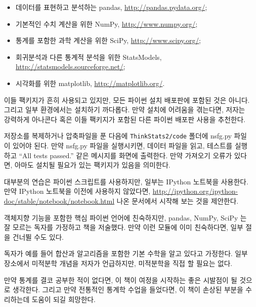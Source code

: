 \begin{itemize}

\item 데이터를 표현하고 분석하는 pandas, \url{http://pandas.pydata.org/};

\item 기본적인 수치 계산을 위한 NumPy, \url{http://www.numpy.org/};

\item 통계를 포함한 과학 계산을 위한 SciPy, \url{http://www.scipy.org/};

\item 회귀분석과 다른 통계적 분석을 위한 StatsModels, \url{http://statsmodels.sourceforge.net/};

\item 시각화를 위한 matplotlib, \url{http://matplotlib.org/}.

\end{itemize}

이들 팩키지가 흔히 사용되고 있지만, 모든 파이썬 설치 배포판에 포함된 것은 아니다. 그리고 일부 환경에서는 설치하기 까다롭다.
만약 설치에 어려움을 겪는다면, 저자는 강력하게 아나콘다 혹은 이들 팩키지가 포함된 다른 파이썬 배포판 사용을 추천한다. 

저장소를 복제하거나 압축파일을 푼 다음에 {\tt ThinkStats2/code} 폴더에 {nsfg.py} 파일이 있어야 된다.
만약 {nsfg.py} 파일을 실행시키면, 데이터 파일을 읽고, 테스트를 실행하고 ``All tests passed.'' 같은 메시지를 화면에 출력한다.
만약 가져오기 오류가 있다면, 아마도 설치될 필요가 있는 팩키지가 있음을 의미한다.

대부분의 연습은 파이썬 스크립트를 사용하지만, 일부는 IPython 노트북을 사용한다. 만약 IPython 노트북을 이전에 사용하지 않았다면, 
\url{http://ipython.org/ipython-doc/stable/notebook/notebook.html} 나온 문서에서 시작해 보는 것을 제안한다.

객체지향 기능을 포함한 핵심 파이썬 언어에 친숙하지만, pandas, NumPy, SciPy 는 잘 모르는 독자를 가정하고 책을 저술했다. 
만약 이런 모듈에 이미 친숙하다면, 일부 절을 건너뛸 수도 있다.

독자가 예를 들어 합산과 알고리즘을 포함한 기본 수학을 알고 있다고 가정한다. 일부 장소에서 미적분학 개념을 저자가 언급하지만, 미적분학을 직접 할 필요는 없다.

만약 통계를 결코 공부한 적이 없다면, 이 책이 여정을 시작하는 좋은 시발점이 될 것으로 생각한다. 그리고 만약 전통적인 통계학 수업을 들었다면, 이 책이 손상된 부분을 수리하는데 도움이 되길 희망한다.


